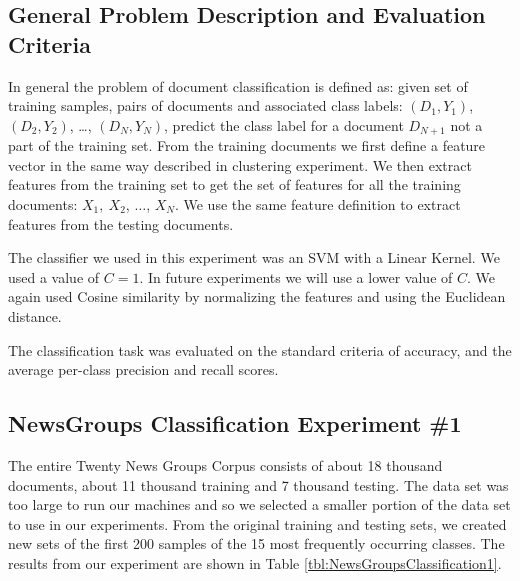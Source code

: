 \documentclass[11pt]{article}
\begin{document}
\subsection{General Problem Description and Evaluation Criteria}

In general the problem of document classification is defined as: given set of training samples, pairs of documents and associated class labels: $(D_1, Y_1)$, $(D_2, Y_2)$, \dots, $(D_N, Y_N)$, predict the class label for a document $D_{N+1}$ not a part of the training set. From the training documents we first define a feature vector in the same way described in clustering experiment. We then extract features from the training set to get the set of features for all the training documents: $X_1,\ X_2$, $\dots$, $X_N$. We use the same feature definition to extract features from the testing documents. 

The classifier we used in this experiment was an SVM with a Linear Kernel. We used a value of $C=1$. In future experiments we will use a lower value of $C$. We again used Cosine similarity by normalizing the features and using the Euclidean distance.  

The classification task was evaluated on the standard criteria of accuracy, and the average per-class precision and recall scores.

\subsection{NewsGroups Classification Experiment \#1}

The entire Twenty News Groups Corpus consists of about 18 thousand documents, about 11 thousand training and 7 thousand testing. The data set was too large to run our machines and so we selected a smaller portion of the data set to use in our experiments. From the original training and testing sets, we created new sets of the first 200 samples of the 15 most frequently occurring classes. The results from our experiment are shown in Table \ref{tbl:NewsGroupsClassification1}.
\end{document}
